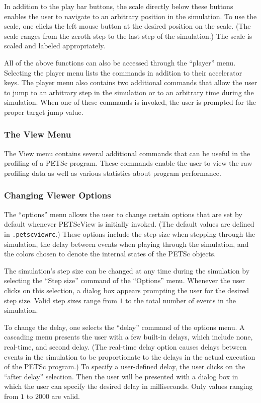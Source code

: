 In addition to the play bar buttons, the scale directly below these
buttons enables the user to navigate to an arbitrary position in the
simulation.  To use the scale, one clicks the left mouse button at
the desired position on the scale.  (The scale ranges from the zeroth
step to the last step of the simulation.)  The scale is scaled and
labeled appropriately.

All of the above functions can also be accessed through the ``player''
menu.  Selecting the player menu lists the commands in addition to
their accelerator keys.  The player menu also contains two additional
commands that allow the user to jump to an arbitrary step in the
simulation or to an arbitrary time during the simulation.  When one of
these commands is invoked, the user is prompted for the proper target
jump value.

\subsubsection{The View Menu}

The View menu contains several additional commands that can be useful
in the profiling of a PETSc program.  These commands enable the user
to view the raw profiling data as well as various statistics about
program performance.

\subsubsection{Changing Viewer Options}

The ``options'' menu allows the user to change certain options that
are set by default whenever PETScView is initially invoked.
(The default values are defined in {\tt .petscviewrc}.) These options
include the step size when stepping through the simulation, the delay
between events when playing through the simulation, and the colors
chosen to denote the internal states of the PETSc objects.

The simulation's step size can be changed at any time during the
simulation by selecting the ``Step size'' command of the ``Options''
menu.  Whenever the user clicks on this selection, a dialog box
appears prompting the user for the desired step size.  Valid step
sizes range from $1$ to the total number of events in the simulation.

To change the delay, one selects the ``delay'' command of the options
menu.  A cascading menu presents the user with a few built-in delays,
which include none, real-time, and second delay.  (The real-time
delay option causes delays between events in the simulation to be
proportionate to the delays in the actual execution of the PETSc
program.)  To specify a user-defined delay, the user clicks on
the ``after delay'' selection.  Then the user will be
presented with a dialog box in which the user can specify the desired
delay in milliseconds.  Only values ranging from $1$ to $2000$ are
valid.

